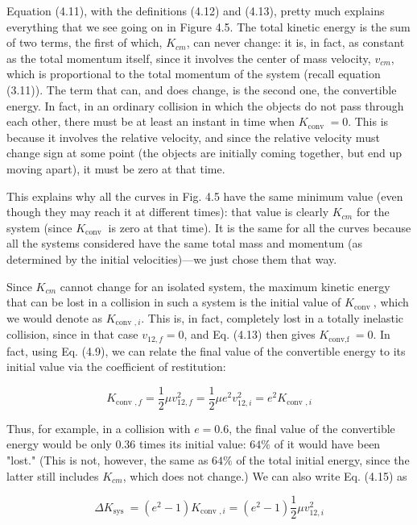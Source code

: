 \documentclass[10pt]{article}
\begin{document}
Equation (4.11), with the definitions (4.12) and (4.13), pretty much explains everything that we see going on in Figure 4.5. The total kinetic energy is the sum of two terms, the first of which, $K_{c m}$, can never change: it is, in fact, as constant as the total momentum itself, since it involves the center of mass velocity, $v_{c m}$, which is proportional to the total momentum of the system (recall equation (3.11)). The term that can, and does change, is the second one, the convertible energy. In fact, in an ordinary collision in which the objects do not pass through each other, there must be at least an instant in time when $K_{\text {conv }}=0$. This is because it involves the relative velocity, and since the relative velocity must change sign at some point (the objects are initially coming together, but end up moving apart), it must be zero at that time.

This explains why all the curves in Fig. 4.5 have the same minimum value (even though they may reach it at different times): that value is clearly $K_{c m}$ for the system (since $K_{\text {conv }}$ is zero at that time). It is the same for all the curves because all the systems considered have the same total mass and momentum (as determined by the initial velocities)—we just chose them that way.

Since $K_{c m}$ cannot change for an isolated system, the maximum kinetic energy that can be lost in a collision in such a system is the initial value of $K_{\text {conv }}$, which we would denote as $K_{\text {conv }, i}$. This is, in fact, completely lost in a totally inelastic collision, since in that case $v_{12, f}=0$, and Eq. (4.13) then gives $K_{\text {conv,f }}=0$. In fact, using Eq. (4.9), we can relate the final value of the convertible energy to its initial value via the coefficient of restitution:


\begin{equation*}
K_{\text {conv }, f}=\frac{1}{2} \mu v_{12, f}^{2}=\frac{1}{2} \mu e^{2} v_{12, i}^{2}=e^{2} K_{\text {conv }, i} \tag{4.15}
\end{equation*}


Thus, for example, in a collision with $e=0.6$, the final value of the convertible energy would be only 0.36 times its initial value: $64 \%$ of it would have been "lost." (This is not, however, the same as $64 \%$ of the total initial energy, since the latter still includes $K_{c m}$, which does not change.) We can also write Eq. (4.15) as


\begin{equation*}
\Delta K_{\text {sys }}=\left(e^{2}-1\right) K_{\text {conv }, i}=\left(e^{2}-1\right) \frac{1}{2} \mu v_{12, i}^{2} \tag{4.16}
\end{equation*}
\end{document}
